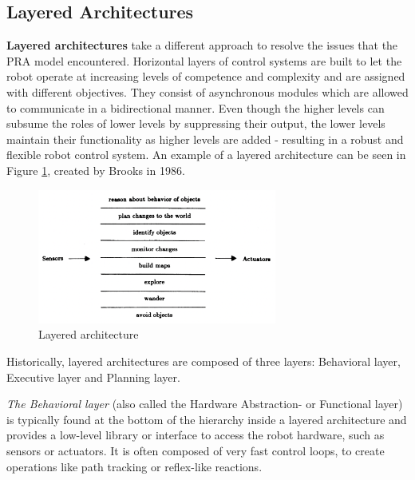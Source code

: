 \documentclass[%
paper=A4,               %
twoside=true,           %
openright,              %
11pt,                   %
bibliography=totoc,     %
titlepage=on,           %
DIV=12,                 %
BCOR=1.5cm,             %
parskip=half,            %
final
]{scrreprt}
\begin{document}
	\subsection{Layered Architectures}
	\textbf{Layered architectures} take a different approach to resolve the issues that the PRA model encountered. Horizontal layers of control systems are built to let the robot operate at increasing levels of competence and complexity and are assigned with different objectives. They consist of asynchronous modules which are allowed to communicate in a bidirectional manner. \autocite{brooksRobustLayeredControl1986} 
	Even though the higher levels can subsume the roles of lower levels by suppressing their output, the lower levels maintain their functionality as higher levels are added - resulting in a robust and flexible robot control system. \autocite{brooksRobustLayeredControl1986} An example of a layered architecture can be seen in Figure \ref{fig: fig2}, created by Brooks in 1986. \autocite{brooksRobustLayeredControl1986}
	

	\begin{figure}[ht]
		\centering
		\includegraphics[width=0.7\textwidth]{Graphics/LayeredArchitecture}
		\caption{Layered architecture \autocite{brooksRobustLayeredControl1986}}
		\label{fig: fig2}
	\end{figure}
	
	Historically, layered architectures are composed of three layers: Behavioral layer, Executive layer and Planning layer. \autocite{jun-youngjungThreelayeredHybridArchitecture2008,peterbonassoExperiencesArchitectureIntelligent1997}
	
	\textit{The Behavioral layer} (also called the Hardware Abstraction-  or Functional layer) is typically found at the bottom of the hierarchy inside a layered architecture and provides a low-level library or interface to access the robot hardware, such as sensors or actuators. \autocite{jun-youngjungThreelayeredHybridArchitecture2008,simmonsLayeredArchitectureCoordination2002} It is often composed of very fast control loops, to create operations like path tracking or reflex-like reactions. \autocite{schillingAutonomeSystemeUnd2023} 
	
\end{document}

